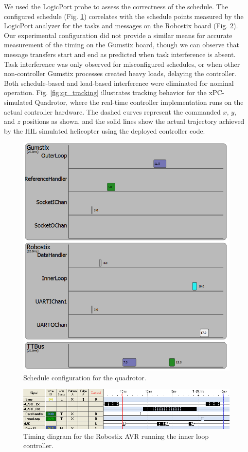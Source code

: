 We used the LogicPort probe to assess the correctness of the schedule.  
The configured schedule (Fig. \ref{fig:sched_schedviz}) correlates with the
schedule points measured by the LogicPort analyzer for the tasks and messages on the Robostix board (Fig. \ref{fig:sched_nodelays}).  Our experimental configuration did not provide a similar means for accurate measurement of the timing on the Gumstix board, though we can observe that message transfers start and end as predicted when task interference is absent.  Task interference was only observed
for misconfigured schedules, or when other non-controller Gumstix 
processes created heavy loads, delaying the controller.  Both schedule-based
and load-based interference were eliminated for nominal operation.
Fig. \ref{fig:qr_tracking} illustrates tracking behavior for the xPC-simulated Quadrotor, where the real-time controller implementation runs on the actual controller hardware.  The dashed curves represent the commanded $x$, $y$, and $z$ 
positions as shown, and the solid lines show the actual trajectory achieved by
the HIL simulated helicopter using the deployed controller code.

\begin{figure}[thb]
\centering
\includegraphics[width=0.8\columnwidth]{figures/qr_demo_schedviz.png}
    \caption{Schedule configuration for the quadrotor.}
    \label{fig:sched_schedviz}
\end{figure}

\begin{figure}[thb]
\centering
\includegraphics[width=\columnwidth]{figures/schedule_nodelays.png}
    \caption{Timing diagram for the Robostix AVR running the inner loop controller.}
    \label{fig:sched_nodelays}
\end{figure}

